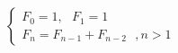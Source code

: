 \documentclass[preview]{standalone}
\begin{document}
\begin{align*}
\begin{cases}F_0 = 1,\:\:\: F_1 = 1\\F_n = F_{n - 1} + F_{n - 2} \:\:\:, n > 1\end{cases}
\end{align*}
\end{document}
